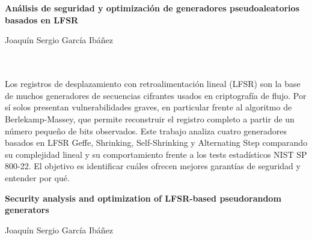 \chapter*{}
\thispagestyle{empty}

\cleardoublepage
\thispagestyle{empty}

\begin{center}
{\large\bfseries Análisis de seguridad y optimización de generadores pseudoaleatorios basados en LFSR}\\
\end{center}
\begin{center}
Joaquín Sergio García Ibáñez\\
\end{center}

\\

\vspace{0.7cm}
\\

Los registros de desplazamiento con retroalimentación lineal (LFSR) son la base de muchos generadores de secuencias cifrantes usados en criptografía de flujo.
Por sí solos presentan vulnerabilidades graves, en particular frente al algoritmo de Berlekamp-Massey, que permite reconstruir el registro completo a partir de un número pequeño de bits observados.
Este trabajo analiza cuatro generadores basados en LFSR Geffe, Shrinking, Self-Shrinking y Alternating Step comparando su complejidad lineal y su comportamiento frente a los tests estadísticos
NIST SP 800-22. El objetivo es identificar cuáles ofrecen mejores garantías de seguridad y entender por qué.

\cleardoublepage

\thispagestyle{empty}

\begin{center}
{\large\bfseries Security analysis and optimization of LFSR-based pseudorandom generators}\\
\end{center}
\begin{center}
Joaquín Sergio García Ibáñez\\
\end{center}

\\

